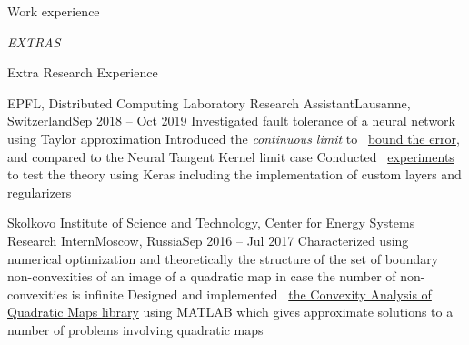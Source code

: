\documentclass{resume} %
\newcommand*{\img}[1]{%
	\raisebox{-.02\baselineskip}{%
		\texttt{[image: \#1]}%
	}%
}
\newcommand*{\emoji}[1]{\img{./emoji/\imgpref#1.png}}
\newcommand*{\mybold}[1]{{\color{pinkunderline} #1}}
\def\imgpref{bleak-}
\newcommand{\mylink}{{\color{gray}\faExternalLink}}
\begin{document}
\begin{rSection}{Work experience}

\end{rSection}


\newpage
\dotfill
\vspace{30pt}
\begin{center}
	\mybold{
		{\em\Huge EXTRAS\ding{80}}
		\rfoot{Extra page \thepage \hspace{1pt} of 2}
		\setcounter{page}{1}
	}
\end{center}
\vspace{30pt}

\begin{rSection}{Extra Research Experience}
	\begin{rSubsection}{EPFL, Distributed Computing Laboratory \emoji{flag-ch}}{Research Assistant}{Lausanne, Switzerland}{Sep 2018 -- Oct 2019}
		\myitem Investigated \mybold{fault tolerance} of a neural network using \mybold{Taylor approximation}
		\myitem Introduced the {\em continuous limit} to \mylink~\href{https://arxiv.org/abs/1902.01686}{bound the error}, and compared to the Neural Tangent Kernel limit case
		\myitem Conducted \mylink~\href{https://github.com/LPD-EPFL/ProbabilisticFaultToleranceNNs}{experiments} to test the theory using \mybold{Keras} including the \mybold{implementation} of custom layers and regularizers
	\end{rSubsection}

	\begin{rSubsection}{Skolkovo Institute of Science and Technology, Center for Energy Systems \emoji{flag-ru}}{Research Intern}{Moscow, Russia}{Sep 2016 -- Jul 2017}
	\myitem Characterized using \mybold{numerical optimization} and \mybold{theoretically} the structure of the set of boundary non-convexities of an image of a quadratic map in case the number of non-convexities is infinite
	\myitem Designed and implemented \mylink~\href{https://github.com/sergeivolodin/CAQM}{the Convexity Analysis of Quadratic Maps \mybold{library}} using \mybold{MATLAB} which gives approximate solutions to a number of problems involving quadratic maps
   \end{rSubsection}
\end{rSection}
\end{document}
